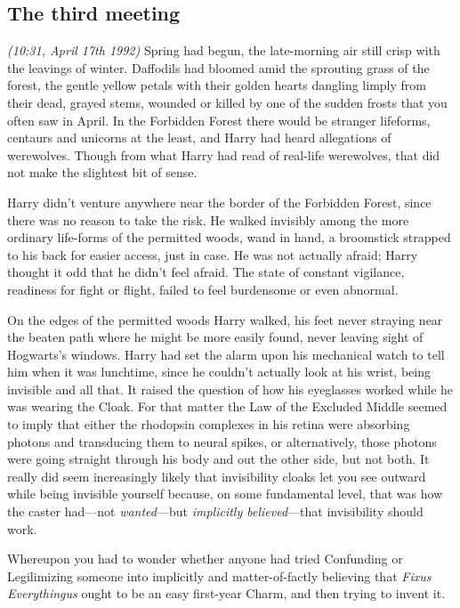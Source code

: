 
\subsection{The third meeting}

\emph{(10:31\AM, April 17th 1992)} Spring had begun, the late-morning air still crisp with the leavings of winter. Daffodils had bloomed amid the sprouting grass of the forest, the gentle yellow petals with their golden hearts dangling limply from their dead, grayed stems, wounded or killed by one of the sudden frosts that you often saw in April. In the Forbidden Forest there would be stranger lifeforms, centaurs and unicorns at the least, and Harry had heard allegations of werewolves. Though from what Harry had read of real-life werewolves, that did not make the slightest bit of sense.

Harry didn’t venture anywhere near the border of the Forbidden Forest, since there was no reason to take the risk. He walked invisibly among the more ordinary life-forms of the permitted woods, wand in hand, a broomstick strapped to his back for easier access, just in case. He was not actually afraid; Harry thought it odd that he didn’t feel afraid. The state of constant vigilance, readiness for fight or flight, failed to feel burdensome or even abnormal.

On the edges of the permitted woods Harry walked, his feet never straying near the beaten path where he might be more easily found, never leaving sight of Hogwarts’s windows. Harry had set the alarm upon his mechanical watch to tell him when it was lunchtime, since he couldn’t actually look at his wrist, being invisible and all that. It raised the question of how his eyeglasses worked while he was wearing the Cloak. For that matter the Law of the Excluded Middle seemed to imply that either the rhodopsin complexes in his retina were absorbing photons and transducing them to neural spikes, or alternatively, those photons were going straight through his body and out the other side, but not both. It really did seem increasingly likely that invisibility cloaks let you see outward while being invisible yourself because, on some fundamental level, that was how the caster had—not \emph{wanted}—but \emph{implicitly believed}—that invisibility should work.

Whereupon you had to wonder whether anyone had tried Confunding or Legilimizing someone into implicitly and matter-of-factly believing that \emph{Fixus Everythingus} ought to be an easy first-year Charm, and then trying to invent it.

